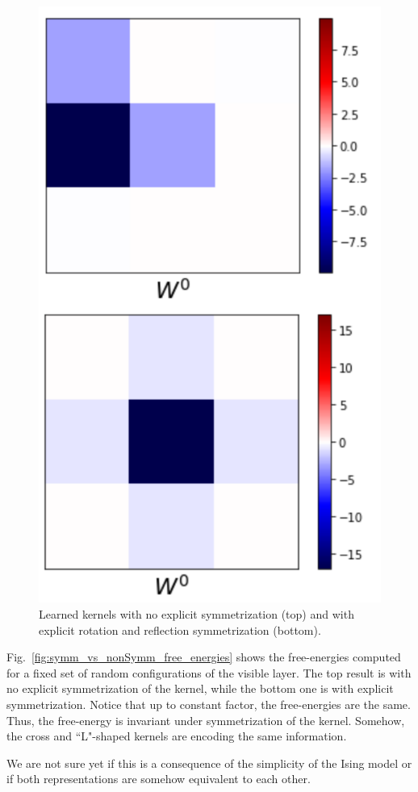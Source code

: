 \documentclass[12pt]{article}
\newcommand{\Figref}[1]{Fig.~\ref{#1}}
\begin{document}
\begin{figure}[h!]
\begin{center}
    \includegraphics[width=0.5\columnwidth]{figures/learned_kernel_3by3_combined_heatmap_nonSymmVsSymm.png}
\end{center}
\caption{Learned kernels with no explicit symmetrization (top) and with explicit rotation and reflection symmetrization (bottom).}
\label{fig:symm_vs_nonSymm_heatmaps}
\end{figure}


\Figref{fig:symm_vs_nonSymm_free_energies} shows the free-energies computed for a fixed set of random configurations of the visible layer. The top result is with no explicit symmetrization of the kernel, while the bottom one is with explicit symmetrization. Notice that up to constant factor, the free-energies are the same. Thus, the free-energy is invariant under symmetrization of the kernel. Somehow, the cross and ``L"-shaped kernels are encoding the same information.

We are not sure yet if this is a consequence of the simplicity of the Ising model or if both representations are somehow equivalent to each other.
\end{document}
